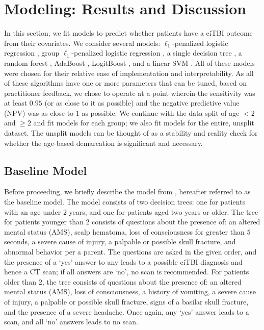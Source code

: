 \documentclass[11pt, letterpaper]{amsart}
\let\Oldsection\section
\renewcommand{\section}{\FloatBarrier\Oldsection}
\let\Oldsubsection\subsection
\renewcommand{\subsection}{\FloatBarrier\Oldsubsection}
\begin{document}
\section{Modeling: Results and Discussion}\label{sec:model}

In this section, we fit models to predict whether patients have a ciTBI outcome from their covariates. We consider several models: $\ell_1$-penalized logistic regression \cite{simon2013sparse}, group $\ell_1$-penalized logistic regression \cite{simon2013sparse}, a single decision tree \cite{safavian1991survey}, a random forest \cite{ho1995random}, AdaBoost \cite{schapire2013explaining}, LogitBoost \cite{cai2006using}, and a linear SVM \cite{boser1992training}. All of these models were chosen for their relative ease of implementation and interpretability. As all of these algorithms have one or more parameters that can be tuned, based on practitioner feedback, we chose to operate at a point wherein the sensitivity was at least $0.95$ (or as close to it as possible) and the negative predictive value (NPV) was as close to $1$ as possible. We continue with the data split of age $< 2$ and $\geq 2$ and fit models for each group; we also fit models for the entire, unsplit dataset. The unsplit models can be thought of as a stability and reality check for whether the age-based demarcation is significant and necessary. 

\subsection{Baseline Model} \label{ssec:baseline}

Before proceeding, we briefly describe the model from \cite{kuppermann2009identification}, hereafter referred to as the baseline model. The model consists of two decision trees: one for patients with an age under $2$ years, and one for patients aged two years or older. The tree for patients younger than $2$ consists of questions about the presence of: an altered mental status (AMS), scalp hematoma, loss of consciousness for greater than $5$ seconds, a severe cause of injury, a palpable or possible skull fracture, and abnormal behavior per a parent. The questions are asked in the given order, and the presence of a `yes' answer to any leads to a possible ciTBI diagnosis and hence a CT scan; if all answers are `no', no scan is recommended. For patients older than $2$, the tree consists of questions about the presence of: an altered mental status (AMS), loss of consciousness, a history of vomiting, a severe cause of injury, a palpable or possible skull fracture, signs of a basilar skull fracture, and the presence of a severe headache. Once again, any `yes' answer leads to a scan, and all `no' answers leads to no scan. 
\end{document}
